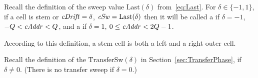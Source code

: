 \documentclass[12pt]{memoir}
\renewcommand{\le}{\leq}
\newcommand{\fld}[1]{\ensuremath{\textit{#1\/}}}
\newcommand{\cAddr}{\fld{cAddr}}
\newcommand{\cDrift}{\fld{cDrift}}
\newcommand{\cSweep}{\fld{cSw}}
\newcommand{\Last}{\mathrm{Last}}
\newcommand{\TransferSw}{\mathrm{TransferSw}}
\begin{document}
\begin{definition}\label{def:outer-cells}
    Recall the definition of the sweep value
    \(  \Last(\delta)  \) from~\eqref{eq:Last}.
    For \( \delta \in \{ -1,1 \} \), if a cell is stem or
\( \cDrift = \delta \),  \( \cSweep = \Last(\delta) \)
    then it will be called a  if
    \( \delta = -1 \), \( -Q< \cAddr < Q \),  and a  
    if \( \delta = 1 \), \( 0\le\cAddr<2Q-1 \).
\end{definition}

According to this definition, a stem cell is both a left and a right outer cell.

Recall the definition of the 
\( \TransferSw(\delta) \) in Section~\ref{sec:TransferPhase}, if \( \delta \ne 0 \).
(There is no transfer sweep if \( \delta = 0 \).)
\end{document}
